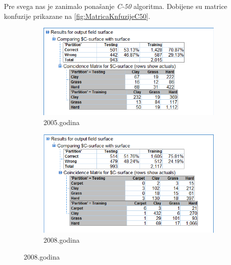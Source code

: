 \documentclass[a4paper]{article}
\begin{document}
Pre svega nas je zanimalo ponašanje \textit{C-50} algoritma. Dobijene su matrice konfuzije prikazane na \ref{fig:MatricaKnfuzijeC50}.

\begin{figure}[H]
	\begin{subfigure}[h]{0.40\textwidth}
		\begin{center}
			\includegraphics[scale=0.55]{Klasifikacija/C50/Analysis_Surface2005.png}
		\end{center}
		\caption{2005.godina}
		\label{fig:MatricaKnfuzijeC502005}
	\end{subfigure}
	\hfill
	\begin{subfigure}[h]{0.40\textwidth}
		\begin{center}
			\includegraphics[scale=0.50]{Klasifikacija/C50/Analysis_Surface2008.png}
		\end{center}
		\caption{2008.godina}
		\label{fig:MatricaKnfuzijeC502008}
	\end{subfigure}
	

\end{figure}
\end{document}
